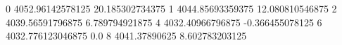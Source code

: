 0 4052.96142578125 20.185302734375
1 4044.85693359375 12.080810546875
2 4039.56591796875 6.789794921875
4 4032.40966796875 -0.366455078125
6 4032.776123046875 0.0
8 4041.37890625 8.602783203125

